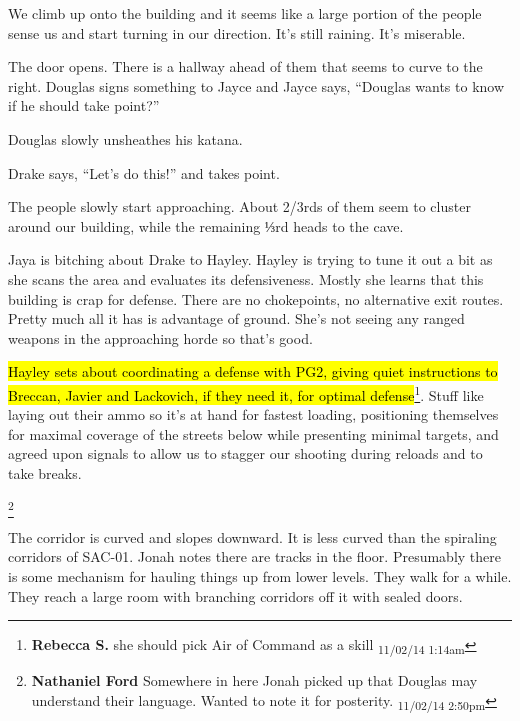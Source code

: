 We climb up onto the building and it seems like a large portion of the people sense us and start turning in our direction.  It's still raining.  It's miserable.





The door opens.  There is a hallway ahead of them that seems to curve to the right.  Douglas signs something to Jayce and Jayce says, ``Douglas wants to know if he should take point?''

Douglas slowly unsheathes his katana.

Drake says, ``Let's do this!'' and takes point.





The people slowly start approaching.  About 2/3rds of them seem to cluster around our building, while the remaining ⅓rd heads to the cave.  

Jaya is bitching about Drake to Hayley.  Hayley is trying to tune it out a bit as she scans the area and evaluates its defensiveness.  Mostly she learns that this building is crap for defense.  There are no chokepoints, no alternative exit routes.  Pretty much all it has is advantage of ground.  She's not seeing any ranged weapons in the approaching horde so that's good.

\hl{Hayley sets about coordinating a defense with PG2, giving quiet instructions to Breccan, Javier and Lackovich, if they need it, for optimal defense}\footnote{\textbf{Rebecca S. }she should pick Air of Command as a skill \textsubscript{11/02/14 1:14am}}.  Stuff like laying out their ammo so it's at hand for fastest loading, positioning themselves for maximal coverage of the streets below while presenting minimal targets, and agreed upon signals to allow us to stagger our shooting during reloads and to take breaks.




\footnote{\textbf{Nathaniel Ford }Somewhere in here Jonah picked up that Douglas may understand their language. Wanted to note it for posterity. \textsubscript{11/02/14 2:50pm}}

The corridor is curved and slopes downward.  It is less curved than the spiraling corridors of SAC-01.  Jonah notes there are tracks in the floor.  Presumably there is some mechanism for hauling things up from lower levels.  They walk for a while.  They reach a large room with branching corridors off it with sealed doors.

